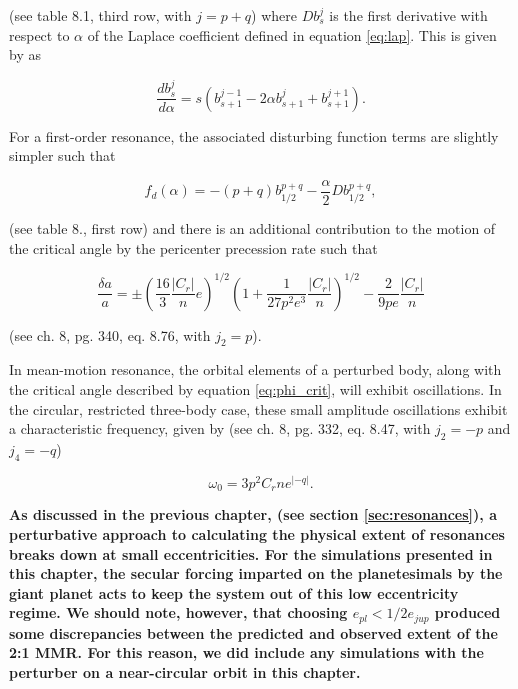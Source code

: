 \noindent (see \cite{murray99} table 8.1, third row, with $j = p + q$) where $D b^{j}_{s}$ is the first derivative with respect to $
\alpha$ of the Laplace coefficient defined in equation \ref{eq:lap}. This is given by \cite{brouwer61} as

\begin{equation}\label{eq:lap_d}
	\frac{d b_{s}^{j}}{d \alpha} = s \left( b_{s+1}^{j-1} - 2 \alpha b_{s+1}^{j} + b_{s+1}^{j+1} \right).
\end{equation}

For a first-order resonance, the associated disturbing function terms are slightly simpler such that

\begin{equation}\label{eq:fd_fo}
	f_{d}(\alpha) = -(p+q) b_{1/2}^{p+q} - \frac{\alpha}{2} D b_{1/2}^{p+q},
\end{equation}

\noindent (see \cite{murray99} table 8., first row) and there is an additional contribution to the motion of the critical angle by the 
pericenter precession rate such that

\begin{equation}\label{eq:res_fo}
	\frac{\delta a}{a} = \pm \left(\frac{16}{3} \frac{\left| C_{r} \right|}{n} e \right)^{1/2} \left(  1 + \frac{1}{27 p^2 e^3} \frac{\left| C_{r} \right|}{n} 
	\right)^{1/2} - \frac{2}{9 p e}  \frac{\left| C_{r} \right|}{n}
\end{equation}

\noindent (see \cite{murray99} ch. 8, pg. 340, eq. 8.76, with $j_{2} = p$).

In mean-motion resonance, the orbital elements of a perturbed body, along with the critical angle described by equation
\ref{eq:phi_crit}, will exhibit oscillations. In the circular, restricted three-body case, these small amplitude oscillations exhibit a 
characteristic frequency, given by (see \cite{murray99} ch. 8, pg. 332, eq. 8.47, with $j_{2} =-p$ and $j_{4} = -q$)

\begin{equation}\label{eq:lib_time}
	\omega_{0} = 3 p^{2} C_{r} n e^{\left| -q \right|}.
\end{equation}

\textbf{As discussed in the previous chapter, (see section \ref{sec:resonances}), a perturbative approach to calculating the physical extent of resonances breaks down at small eccentricities. For the simulations presented in this chapter, the secular forcing imparted on the planetesimals by the giant planet acts to keep the system out of this low eccentricity regime. We should note, however, that choosing $e_{pl} < 1/2 e_{jup}$ produced some discrepancies between the predicted and observed extent of the 2:1 MMR. For this reason, we did include any simulations with the perturber on a near-circular orbit in this chapter.}

